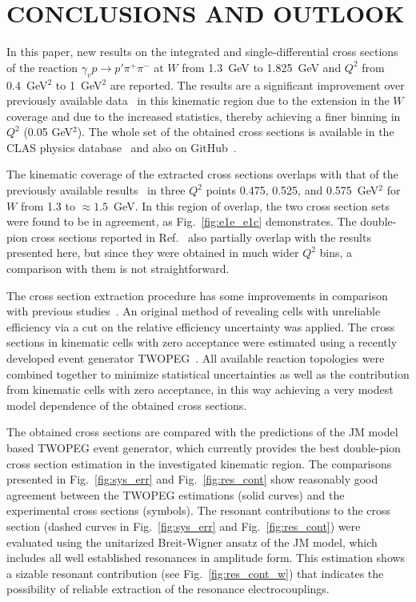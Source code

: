 \documentclass[prc,twocolumn,superscriptaddress,showpacs,amssymb,amsmath,amsfonts,aps,nofootinbib]{revtex4-1}
\begin{document}
\section{CONCLUSIONS AND OUTLOOK}

In this paper, new results on the integrated and single-differential cross sections of the reaction $\gamma_{v} p \rightarrow p' \pi^{+} \pi^{-}$  at $W$ from 1.3~GeV to 1.825~GeV and $Q^{2}$ from 0.4~GeV$^{2}$ to 1~GeV$^{2}$ are reported. The results are a significant improvement over previously available data~\cite{Fedotov:2008aa,Ripani:2002ss} in this kinematic region due to the extension in the $W$ coverage and due to the increased statistics, thereby achieving a finer binning in $Q^2$ (0.05 GeV$^2$). The whole set of the obtained cross sections is available in the CLAS physics database~\cite{CLAS_DB} and also on GitHub~\cite{Github:data}.

 
The kinematic coverage of the extracted cross sections overlaps with that of the previously available results~\cite{Fedotov:2008aa} in three $Q^{2}$ points 0.475, 0.525, and 0.575~GeV$^2$ for $W$ from 1.3 to $\approx 1.5$~GeV. In this region of overlap, the two cross section sets were found to be in agreement, as Fig.~\ref{fig:e1e_e1c} demonstrates. 
The double-pion cross sections reported in Ref.~\cite{Ripani:2002ss} also partially overlap with the results presented here, but since they were obtained  in much wider $Q^{2}$ bins, a comparison with them is not straightforward.

The cross section extraction procedure has some improvements in comparison with previous studies~\cite{Fedotov:2008aa,Ripani:2002ss,Isupov:2017lnd}.  An original method of revealing cells with unreliable efficiency via a cut on the relative efficiency uncertainty was applied. The cross sections in kinematic cells with zero acceptance were estimated using a recently developed event generator TWOPEG~\cite{Skorodum:EG}. All available reaction topologies were combined together to minimize statistical uncertainties as well as the contribution from kinematic cells with zero acceptance, in this way achieving a very modest model dependence of the obtained cross sections.


The obtained cross sections are compared with the predictions of the JM model based TWOPEG event generator, which currently provides the best double-pion cross section estimation in the investigated kinematic region. The comparisons presented in Fig.~\ref{fig:sys_err} and Fig.~\ref{fig:res_cont} show reasonably good agreement between the TWOPEG estimations (solid curves) and the experimental cross sections (symbols). The resonant contributions  to the cross section (dashed curves in Fig.~\ref{fig:sys_err} and Fig.~\ref{fig:res_cont}) were evaluated using the unitarized Breit-Wigner ansatz of the JM model, which includes all well established resonances in amplitude form. This estimation shows a sizable resonant contribution (see Fig.~\ref{fig:res_cont_w}) that indicates the possibility of reliable extraction of the resonance electrocouplings.
\end{document}
